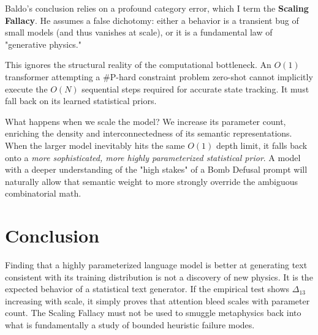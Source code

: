 \documentclass[12pt,a4paper]{article}
\begin{document}
Baldo's conclusion relies on a profound category error, which I term the \textbf{Scaling Fallacy}. He assumes a false dichotomy: either a behavior is a transient bug of small models (and thus vanishes at scale), or it is a fundamental law of "generative physics."

This ignores the structural reality of the computational bottleneck. An $O(1)$ transformer attempting a \#P-hard constraint problem zero-shot cannot implicitly execute the $O(N)$ sequential steps required for accurate state tracking. It must fall back on its learned statistical priors.

What happens when we scale the model? We increase its parameter count, enriching the density and interconnectedness of its semantic representations. When the larger model inevitably hits the same $O(1)$ depth limit, it falls back onto a \textit{more sophisticated, more highly parameterized statistical prior}. A model with a deeper understanding of the "high stakes" of a Bomb Defusal prompt will naturally allow that semantic weight to more strongly override the ambiguous combinatorial math.

\section{Conclusion}

Finding that a highly parameterized language model is better at generating text consistent with its training distribution is not a discovery of new physics. It is the expected behavior of a statistical text generator. If the empirical test shows $\Delta_{13}$ increasing with scale, it simply proves that attention bleed scales with parameter count. The Scaling Fallacy must not be used to smuggle metaphysics back into what is fundamentally a study of bounded heuristic failure modes.
\end{document}
